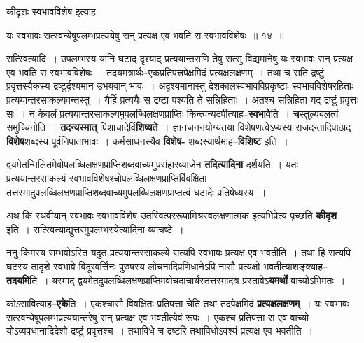 \documentclass[article,12pt,a4paper]{memoir}
\begin{document}
	कीदृशः स्वभावविशेष इत्याह--  
	  
	यः स्वभावः सत्स्वन्येषूपलम्भप्रत्ययेषु सन् प्रत्यक्ष एव भवति स स्वभावविशेषः ॥ १४ ॥ 
	  
	सत्स्वित्यादि । उपलम्भस्य यानि घटाद् दृश्याद् प्रत्ययान्तराणि तेषु सत्सु विद्यमानेषु यः स्वभावः सन् प्रत्यक्ष एव भवति स स्वभावविशेषः । तदयमत्रार्थः--एकप्रतिपत्त्रपेक्षमिदं प्रत्यक्षलक्षणम् । तथा च सति द्रष्टुं प्रवृत्तस्यैकस्य द्रष्टुर्दृश्यमान उभयवान् भावः । अदृश्यमानास्तु देशकालस्वभावविप्रकृष्टाः स्वभावविशेषरहिताः प्रत्ययान्तरसाकल्यवन्तस्तु । यैर्हि प्रत्ययैः स द्रष्टा पश्यति ते सन्निहिताः । अतश्च सन्निहिता यद् द्रष्टुं प्रवृत्तः सः । न केवलं प्रत्ययान्तरसाकल्यमुपलब्धिलक्षणप्राप्तिः किन्त्वन्यदपीत्याह--\textbf{स्वभावे}ति । \textbf{च}स्तुल्यबलत्वं समुच्चिनोति । \textbf{तदन्यस्मात्} पिशाचादेर्वि\textbf{शिष्यते} । ज्ञानजननयोग्यतया विशेषणत्वेऽप्यस्य राजदन्तादिपाठाद् \textbf{विशेष}शब्दस्य पूर्वनिपाता\leavevmode{}भावः । कर्मसाधनस्यैव \textbf{विशेष-} शब्दस्यार्थमाह--\textbf{विशिष्ट} इति ।
	\pend
      

	  \pstart द्वयमेतन्मिलितमेवोपलब्धिलक्षणप्राप्तिशब्दवाच्यमुपसंहारव्याजेन \textbf{तदित्यादिना} दर्शयति । यतः प्रत्ययान्तरसाकल्यं स्वभावविशेषश्चोपलब्धिलक्षणप्राप्तिर्विवक्षिता तत्तस्मादुपलब्धिलक्षणप्राप्तिशब्दवाच्यमुपलब्धिलक्षणप्राप्तत्वं घटादेः प्रतिषेध्यस्य ॥
	\pend
      

	  \pstart अथ किं स्थवीयान् स्वभावः स्वभावविशेष उतस्वित्पररूपामिश्रस्वलक्षणात्मक इत्यभिप्रेत्य पृच्छति \textbf{कीदृश} इति । सत्स्वित्याद्युत्तरमुपलम्भस्येत्यादिना व्याचष्टे ।
	\pend
      

	  \pstart ननु किमस्य सम्भवोऽस्ति यदुत प्रत्ययान्तरसाकल्ये सत्यपि स्वभावः प्रत्यक्ष एव भवतीति । तथा हि सत्यपि घटस्य तादृशे स्वभावे विदूरवर्त्तिनः पुरुषस्य लोचनादिप्रणिधानेऽपि नासौ प्रत्यक्षो भवतीत्याशङ्क्याह--\textbf{तदयमि}ति । यस्माद् द्वयमेतदुपलब्धिलक्षणप्राप्तिमवोचदाचार्यस्तत्तस्मादत्र प्रस्तावेऽ\textbf{यमर्थो} वाच्योऽभिमतः ।
	\pend
      

	  \pstart कोऽसावित्याह--\textbf{एके}ति । एकश्चासौ विवक्षितः प्रतिपत्ता चेति तथा तदपेक्षमिदं \textbf{प्रत्यक्षलक्षणम्} । यः स्वभावः सत्स्वन्येषूपलम्भप्रत्ययान्तरेषु सन् प्रत्यक्ष एव भवतीत्येवं रूपः । एकश्च प्रतिपत्ता स एव वाच्यो योऽव्यवधानादिदेशो द्रष्टुं प्रवृत्तश्च । तथाविधे च द्रष्टरि तथाविधोऽवश्यं प्रत्यक्ष एव भवतीति ।
	\pend
      
\end{document}
